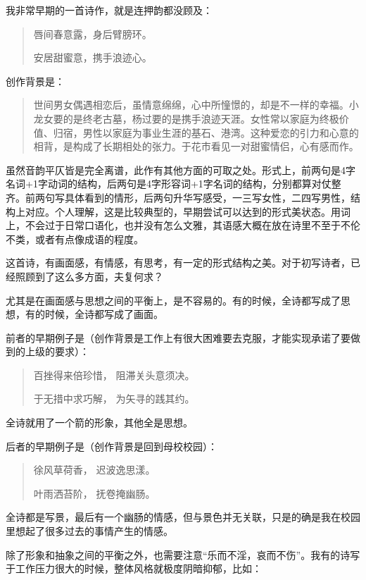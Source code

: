 \documentclass{article}
\begin{document}
我非常早期的一首诗作，就是连押韵都没顾及：

\begin{quote}
唇间春意露，身后臂膀环。

安居甜蜜意，携手浪迹心。
\end{quote}

创作背景是：

\begin{quote}
世间男女偶遇相恋后，虽情意绵绵，心中所憧憬的，却是不一样的幸福。小龙女要的是终老古墓，杨过要的是携手浪迹天涯。女性常以家庭为终极价值、归宿，男性以家庭为事业生涯的基石、港湾。这种爱恋的引力和心意的相背，是构成了长期相处的张力。于花市看见一对甜蜜情侣，心有感而作。
\end{quote}

虽然音韵平仄皆是完全离谱，此作有其他方面的可取之处。形式上，前两句是4字名词+1字动词的结构，后两句是4字形容词+1字名词的结构，分别都算对仗整齐。前两句写具体看到的情形，后两句升华写感受，一三写女性，二四写男性，结构上对应。个人理解，这是比较典型的，早期尝试可以达到的形式美状态。用词上，不会过于日常口语化，也并没有怎么文雅，其语感大概在放在诗里不至于不伦不类，或者有点像成语的程度。

这首诗，有画面感，有情感，有思考，有一定的形式结构之美。对于初写诗者，已经照顾到了这么多方面，夫复何求？

尤其是在画面感与思想之间的平衡上，是不容易的。有的时候，全诗都写成了思想，有的时候，全诗都写成了画面。

前者的早期例子是（创作背景是工作上有很大困难要去克服，才能实现承诺了要做到的上级的要求）：

\begin{quote}
百挫得来倍珍惜， 阻滞关头意须决。

于无措中求巧解， 为矢寻的践其约。
\end{quote}

全诗就用了一个箭的形象，其他全是思想。

后者的早期例子是（创作背景是回到母校校园）：

\begin{quote}
徐风草荷香， 迟波逸思漾。

叶雨洒苔阶， 抚卷掩幽肠。
\end{quote}

全诗都是写景，最后有一个幽肠的情感，但与景色并无关联，只是的确是我在校园里想起了很多过去的事情产生的情感。

除了形象和抽象之间的平衡之外，也需要注意``乐而不淫，哀而不伤''。我有的诗写于工作压力很大的时候，整体风格就极度阴暗抑郁，比如：
\end{document}
